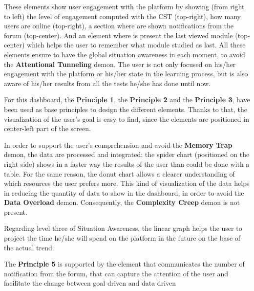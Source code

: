 These elements show user engagement with the platform by showing (from right to left)
the level of engagement computed with the CST (top-right),
how many users are online (top-right), a section
where are shown notifications from the forum (top-center). 
And an element where is present the last viewed module (top-center) which helps the user
to remember what module studied as last.
All these elements ensure to have the global situation awareness in each moment, 
to avoid the \textbf{Attentional Tunneling} demon. The user is not only focused
on his/her engagement with the platform or his/her state in the learning process, but is
also aware of his/her results from all the tests he/she has done until now.

For this dashboard, the \textbf{Principle 1}, the \textbf{Principle 2} and the \textbf{Principle 3},
have been used as base principles to design the different elements. Thanks to that, the 
visualization of the user's goal is easy to find, since the elements are positioned in center-left
part of the screen. 

In order to support the user's comprehension and avoid the 
\textbf{Memory Trap} demon, the data are processed and integrated: the spider chart
(positioned on the right side) shows in a faster way the results of the user than
could be done with a table. For the same reason, the donut chart allows a clearer 
understanding of which resources the user prefers more. This kind of visualization of the
data helps in reducing the quantity of data to show in the dashboard, in order to 
avoid the \textbf{Data Overload} demon. Consequently, the \textbf{Complexity Creep} demon is not present.

Regarding level three of
Situation Awareness, the linear graph helps the user to project the time he/she will
spend on the platform in the future on the base of the actual trend.

The \textbf{Principle 5} is supported by the element that communicates the number of 
notification from the forum, that can capture the attention of the user and
facilitate the change between goal driven and data driven